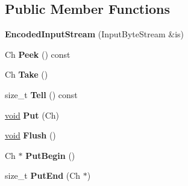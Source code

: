 \subsection*{Public Member Functions}
\begin{DoxyCompactItemize}
\item 
\hypertarget{class_encoded_input_stream_a17f8e629500f6ae71cb72d1d63bf41fd}{}{\bfseries Encoded\+Input\+Stream} (Input\+Byte\+Stream \&is)\label{class_encoded_input_stream_a17f8e629500f6ae71cb72d1d63bf41fd}

\item 
\hypertarget{class_encoded_input_stream_abda3b0c141254343f4c481f67d52b423}{}Ch {\bfseries Peek} () const \label{class_encoded_input_stream_abda3b0c141254343f4c481f67d52b423}

\item 
\hypertarget{class_encoded_input_stream_ab42cd57581bf62e42af471583e5b8377}{}Ch {\bfseries Take} ()\label{class_encoded_input_stream_ab42cd57581bf62e42af471583e5b8377}

\item 
\hypertarget{class_encoded_input_stream_a34cdb99fd81cd211f71903348e9c986f}{}size\+\_\+t {\bfseries Tell} () const \label{class_encoded_input_stream_a34cdb99fd81cd211f71903348e9c986f}

\item 
\hypertarget{class_encoded_input_stream_afea36b666a44bd4adeabfcab7b68a322}{}\hyperlink{_s_d_l__audio_8h_a52835ae37c4bb905b903cbaf5d04b05f}{void} {\bfseries Put} (Ch)\label{class_encoded_input_stream_afea36b666a44bd4adeabfcab7b68a322}

\item 
\hypertarget{class_encoded_input_stream_aa4415bf4b97dd01e8c3de0ad7a161724}{}\hyperlink{_s_d_l__audio_8h_a52835ae37c4bb905b903cbaf5d04b05f}{void} {\bfseries Flush} ()\label{class_encoded_input_stream_aa4415bf4b97dd01e8c3de0ad7a161724}

\item 
\hypertarget{class_encoded_input_stream_ad97f7a549a8622c61b7fb2c63fedd69b}{}Ch $\ast$ {\bfseries Put\+Begin} ()\label{class_encoded_input_stream_ad97f7a549a8622c61b7fb2c63fedd69b}

\item 
\hypertarget{class_encoded_input_stream_a83fe5ed281413d6005d1b324730e8bed}{}size\+\_\+t {\bfseries Put\+End} (Ch $\ast$)\label{class_encoded_input_stream_a83fe5ed281413d6005d1b324730e8bed}

\end{DoxyCompactItemize}


